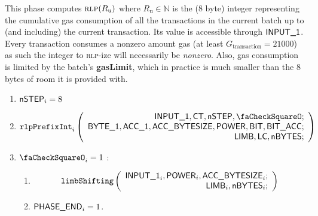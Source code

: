 \begin{center}
\end{center}

This phase computes $\textsc{rlp}(R_\text{u})$ where $R_\text{u} \in \mathbb{N}$  is the (8 byte) integer representing the cumulative gas consumption of all the transactions in the current batch up to (and including) the current transaction. Its value is accessible through $\textsf{INPUT\_1}$. \saNote{} Every transaction consumes a nonzero amount gas (at least $G_\text{transaction} = 21000$) as such the integer to \textsc{rlp}-ize will necessarily be \emph{nonzero}. Also, gas consumption is limited by the batch's \textbf{gasLimit}, which in practice is much smaller than the $8$ bytes of room it is provided with.

\begin{enumerate}
    \item $\textsf{nSTEP}_{i} = 8$
    \item
        \[
            \rlpPrefixInt_{i}
            \left(
            \begin{array}{r}
                \Input{1},
                \ct,
                \nbstep,
                \done; \\
                \byteCol{1},
                \acc{1},
                \accsize,
                \Power,
                \col{BIT},
                \col{BIT\_ACC}; \\
                \limb,
                \lc,
                \limbsize; \\
            \end{array}
            \right)
        \]
    \item \If $\done_{i}=1$ \Then:
    \begin{enumerate}
        \item \[
    \texttt{limbShifting}
    \left(
    \begin{array}{r}
        \textsf{INPUT\_1}_{i},
        \textsf{POWER}_{i},
        \textsf{ACC\_BYTESIZE}_{i}; \\
        \textsf{LIMB}_{i},
        \textsf{nBYTES}_{i}; \\
    \end{array}
    \right)
\]
        \item $\textsf{PHASE\_END}_{i}=1$.  
    \end{enumerate} 
\end{enumerate}
